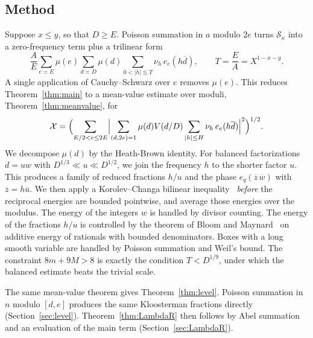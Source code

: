 \documentclass[11pt]{amsart}
\theoremstyle{definition}
\theoremstyle{remark}
\numberwithin{equation}{section}
\newcommand{\cS}{\mathcal S}
\newcommand{\cX}{\mathcal X}
\newcommand{\inv}[1]{\overline{#1}}
\begin{document}
\subsection{Method}
Suppose $x\le y$, so that $D\ge E$.  Poisson summation in $a$ modulo $2e$
turns $\cS_\kappa$ into a zero-frequency term plus a trilinear form
\[
 \frac AE\sum_{e\asymp E}\mu(e)\sum_{d\asymp D}\mu(d)
 \sum_{0<|h|\lesssim T}\nu_h\, e_e(h\inv d),
 \qquad T=\frac{E}{A}=X^{1-x-y}.
\]
A single application of Cauchy--Schwarz over $e$ removes $\mu(e)$.  This
reduces Theorem~\ref{thm:main} to a mean-value estimate over moduli,
Theorem~\ref{thm:meanvalue}, for
\[
 \cX=\Bigl(\sum_{E/2<e\le2E}\Bigl|\sum_{(d,2e)=1}\mu(d)V(d/D)
 \sum_{|h|\le H}\nu_h\,e_e(h\inv d)\Bigr|^2\Bigr)^{1/2}.
\]
We decompose $\mu(d)$ by the Heath-Brown identity.  For balanced
factorizations $d=uw$ with $D^{1/3}\ll u\ll D^{1/2}$, we join the frequency
$h$ to the shorter factor $u$.  This produces a family of reduced fractions
$h/u$ and the phase $e_q(\inv z\,\inv w)$ with $\inv z=h\inv u$.  We then
apply a Korolev--Changa bilinear inequality~\cite{KC} \emph{before} the
reciprocal energies are bounded pointwise, and average those energies over
the modulus.  The energy of the integers $w$ is handled by divisor counting.
The energy of the fractions $h/u$ is controlled by the theorem of Bloom and
Maynard~\cite{BM} on additive energy of rationals with bounded
denominators.  Boxes with a long smooth variable are handled by Poisson
summation and Weil's bound.  The constraint $8m+9M>8$ is exactly the
condition $T<D^{1/9}$, under which the balanced estimate beats the trivial
scale.

The same mean-value theorem gives Theorem~\ref{thm:level}.  Poisson
summation in $n$ modulo $[d,e]$ produces the same Kloosterman fractions
directly (Section~\ref{sec:level}).  Theorem~\ref{thm:LambdaR} then follows
by Abel summation and an evaluation of the main term
(Section~\ref{sec:LambdaR}).
\end{document}
